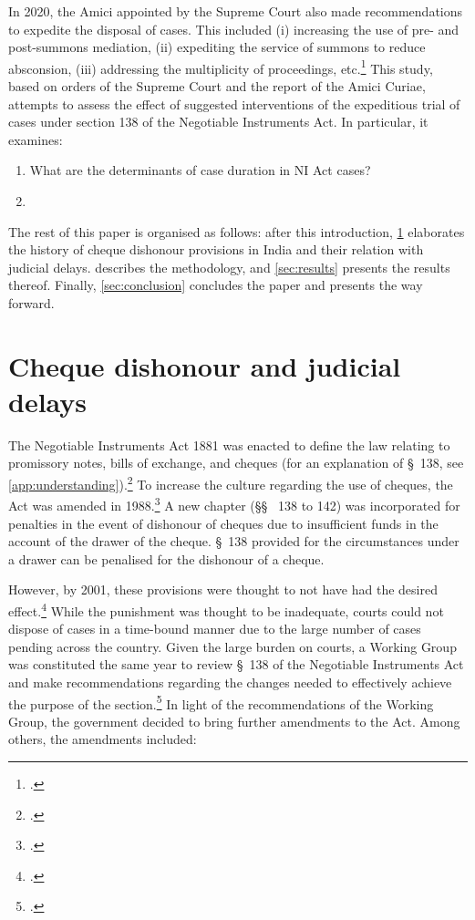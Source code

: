 In 2020, the Amici appointed by the Supreme Court also made recommendations to expedite the disposal of cases. This included (i) increasing the use of pre- and post-summons mediation, (ii) expediting the service of summons to reduce absconsion, (iii) addressing the multiplicity of proceedings, etc.\footcite{amicus2020_submission} This study, based on orders of the Supreme Court and the report of the Amici Curiae, attempts to assess the effect of suggested interventions of the expeditious trial of cases under section 138 of the Negotiable Instruments Act. In particular, it examines:

\begin{enumerate}
 \item What are the determinants of case duration in NI Act cases?
 \item 
\end{enumerate}

The rest of this paper is organised as follows: after this introduction, \cref{sec:history} elaborates the history of cheque dishonour provisions in India and their relation with judicial delays.  describes the methodology, and \cref{sec:results} presents the results thereof. Finally, \cref{sec:conclusion} concludes the paper and presents the way forward.

\section{Cheque dishonour and judicial delays}
\label{sec:history}

The Negotiable Instruments Act 1881 was enacted to define the law relating to promissory notes, bills of exchange, and cheques (for an explanation of \S~138, see \cref{app:understanding}).\footcite{ind1881_niAct} To increase the culture regarding the use of cheques, the Act was amended in 1988.\footcite{niAmend1988} A new chapter (\S\S~ 138 to 142) was incorporated for penalties in the event of dishonour of cheques due to insufficient funds in the account of the drawer of the cheque. \S~138 provided for the circumstances under a drawer can be penalised for the dishonour of a cheque.

However, by 2001, these provisions were thought to not have had the desired effect.\footcite{stdcomm2001_138niAct} While the punishment was thought to be inadequate, courts could not dispose of cases in a time-bound manner due to the large number of cases pending across the country. Given the large burden on courts, a Working Group was constituted the same year to review \S~138 of the Negotiable Instruments Act and make recommendations regarding the changes needed to effectively achieve the purpose of the section.\footcite{wg2001_138} In light of the recommendations of the Working Group, the government decided to bring further amendments to the Act. Among others, the amendments included:

